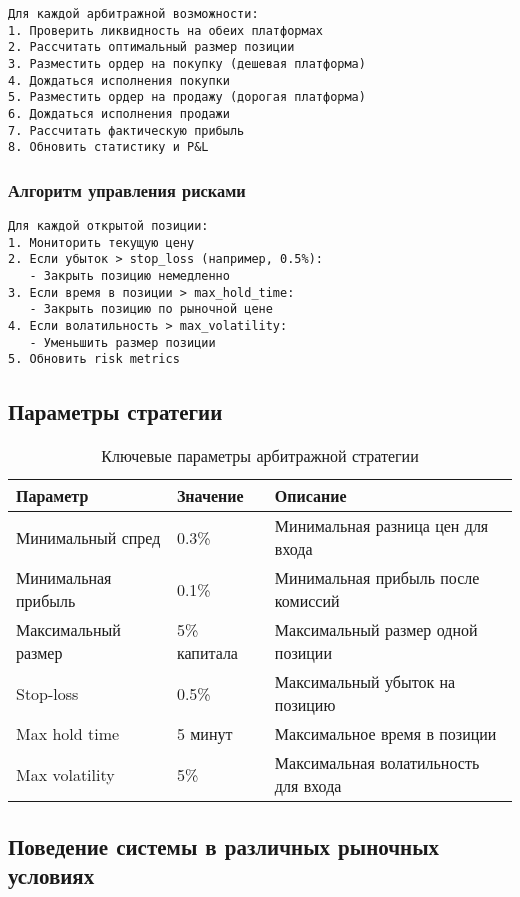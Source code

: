 \documentclass[a4paper,11pt]{article}
\begin{document}
\begin{verbatim}
Для каждой арбитражной возможности:
1. Проверить ликвидность на обеих платформах
2. Рассчитать оптимальный размер позиции
3. Разместить ордер на покупку (дешевая платформа)
4. Дождаться исполнения покупки
5. Разместить ордер на продажу (дорогая платформа)
6. Дождаться исполнения продажи
7. Рассчитать фактическую прибыль
8. Обновить статистику и P&L
\end{verbatim}

\subsubsection{Алгоритм управления рисками}

\begin{verbatim}
Для каждой открытой позиции:
1. Мониторить текущую цену
2. Если убыток > stop_loss (например, 0.5%):
   - Закрыть позицию немедленно
3. Если время в позиции > max_hold_time:
   - Закрыть позицию по рыночной цене
4. Если волатильность > max_volatility:
   - Уменьшить размер позиции
5. Обновить risk metrics
\end{verbatim}

\subsection{Параметры стратегии}

\begin{table}[H]
\centering
\begin{tabular}{|l|l|l|}
\hline
\textbf{Параметр} & \textbf{Значение} & \textbf{Описание} \\
\hline
Минимальный спред & 0.3\% & Минимальная разница цен для входа \\
Минимальная прибыль & 0.1\% & Минимальная прибыль после комиссий \\
Максимальный размер & 5\% капитала & Максимальный размер одной позиции \\
Stop-loss & 0.5\% & Максимальный убыток на позицию \\
Max hold time & 5 минут & Максимальное время в позиции \\
Max volatility & 5\% & Максимальная волатильность для входа \\
\hline
\end{tabular}
\caption{Ключевые параметры арбитражной стратегии}
\end{table}

\subsection{Поведение системы в различных рыночных условиях}
\end{document}
